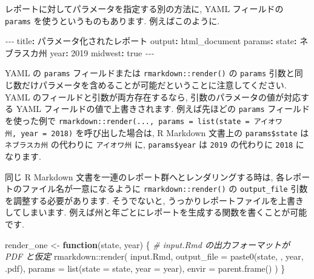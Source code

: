 \documentclass[
  11pt,
]{bxjsreport}
\newenvironment{Shaded}{\begin{snugshade}}{\end{snugshade}}
\newcommand{\AttributeTok}[1]{\textcolor[rgb]{0.77,0.63,0.00}{#1}}
\newcommand{\CharTok}[1]{\textcolor[rgb]{0.31,0.60,0.02}{#1}}
\newcommand{\CommentTok}[1]{\textcolor[rgb]{0.56,0.35,0.01}{\textit{#1}}}
\newcommand{\ControlFlowTok}[1]{\textcolor[rgb]{0.13,0.29,0.53}{\textbf{#1}}}
\newcommand{\DecValTok}[1]{\textcolor[rgb]{0.00,0.00,0.81}{#1}}
\newcommand{\FunctionTok}[1]{\textcolor[rgb]{0.00,0.00,0.00}{#1}}
\newcommand{\KeywordTok}[1]{\textcolor[rgb]{0.13,0.29,0.53}{\textbf{#1}}}
\newcommand{\NormalTok}[1]{#1}
\newcommand{\OtherTok}[1]{\textcolor[rgb]{0.56,0.35,0.01}{#1}}
\newcommand{\PreprocessorTok}[1]{\textcolor[rgb]{0.56,0.35,0.01}{\textit{#1}}}
\newcommand{\SpecialCharTok}[1]{\textcolor[rgb]{0.00,0.00,0.00}{#1}}
\newcommand{\StringTok}[1]{\textcolor[rgb]{0.31,0.60,0.02}{#1}}
\begin{document}
レポートに対してパラメータを指定する別の方法に, YAML フィールドの \texttt{params} を使うというものもあります. 例えばこのように.

\begin{Shaded}
\begin{Highlighting}[]
\PreprocessorTok{{-}{-}{-}}
\FunctionTok{title}\KeywordTok{:}\AttributeTok{ パラメータ化されたレポート}
\FunctionTok{output}\KeywordTok{:}\AttributeTok{ html\_document}
\FunctionTok{params}\KeywordTok{:}
\AttributeTok{  }\FunctionTok{state}\KeywordTok{:}\AttributeTok{ ネブラスカ州}
\AttributeTok{  }\FunctionTok{year}\KeywordTok{:}\AttributeTok{ }\DecValTok{2019}
\AttributeTok{  }\FunctionTok{midwest}\KeywordTok{:}\AttributeTok{ }\CharTok{true}
\PreprocessorTok{{-}{-}{-}}
\end{Highlighting}
\end{Shaded}

YAML の \texttt{params} フィールドまたは \texttt{rmarkdown::render()} の \texttt{params} 引数と同じ数だけパラメータを含めることが可能だということに注意してください. YAML のフィールドと引数が両方存在するなら, 引数のパラメータの値が対応する YAML フィールドの値で上書きされます. 例えば先ほどの \texttt{params} フィールドを使った例で \texttt{rmarkdown::render(..., params = list(state = \textquotesingle{}アイオワ州\textquotesingle{},\ year\ =\ 2018)} を呼び出した場合は, R Markdown 文書上の \texttt{params\$state} は \texttt{ネブラスカ州} の代わりに \texttt{アイオワ州} に, \texttt{params\$year} は \texttt{2019} の代わりに \texttt{2018} になります.

同じ R Markdown 文書を一連のレポート群へとレンダリングする時は, 各レポートのファイル名が一意になるように \texttt{rmarkdown::render()} の \texttt{output\_file} 引数を調整する必要があります. そうでないと, うっかりレポートファイルを上書きしてしまいます. 例えば州と年ごとにレポートを生成する関数を書くことが可能です.

\begin{Shaded}
\begin{Highlighting}[numbers=left,,]
\NormalTok{render\_one }\OtherTok{\textless{}{-}} \ControlFlowTok{function}\NormalTok{(state, year) \{}
  \CommentTok{\# input.Rmd の出力フォーマットが PDF と仮定}
\NormalTok{  rmarkdown}\SpecialCharTok{::}\FunctionTok{render}\NormalTok{(}
    \StringTok{\textquotesingle{}input.Rmd\textquotesingle{}}\NormalTok{,}
    \AttributeTok{output\_file =} \FunctionTok{paste0}\NormalTok{(state, }\StringTok{\textquotesingle{}{-}\textquotesingle{}}\NormalTok{, year, }\StringTok{\textquotesingle{}.pdf\textquotesingle{}}\NormalTok{),}
    \AttributeTok{params =} \FunctionTok{list}\NormalTok{(}\AttributeTok{state =}\NormalTok{ state, }\AttributeTok{year =}\NormalTok{ year),}
    \AttributeTok{envir =} \FunctionTok{parent.frame}\NormalTok{()}
\NormalTok{  )}
\NormalTok{\}}
\end{Highlighting}
\end{Shaded}
\end{document}
